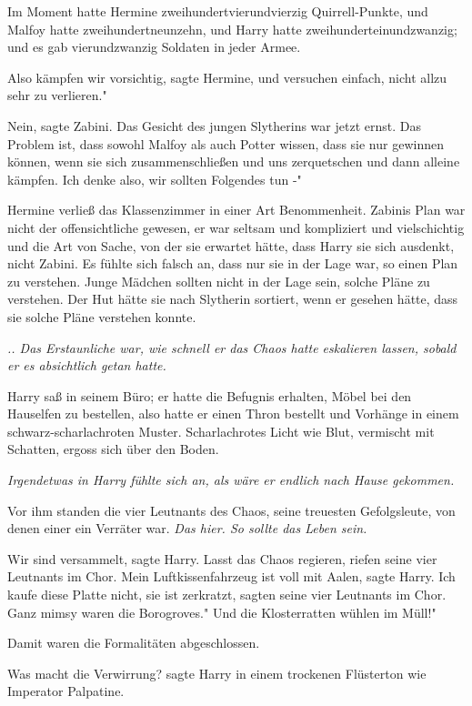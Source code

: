 Im Moment hatte Hermine zweihundertvierundvierzig Quirrell-Punkte, und Malfoy
hatte zweihundertneunzehn, und Harry hatte zweihunderteinundzwanzig; und es gab
vierundzwanzig Soldaten in jeder Armee.

\glqq Also kämpfen wir vorsichtig\grqq{}, sagte Hermine, \glqq und versuchen
einfach, nicht allzu sehr zu verlieren."

\glqq Nein\grqq{}, sagte Zabini. Das Gesicht des jungen Slytherins war jetzt
ernst. \glqq Das Problem ist, dass sowohl Malfoy als auch Potter wissen, dass
sie nur gewinnen können, wenn sie sich zusammenschließen und uns zerquetschen
und dann alleine kämpfen. Ich denke also, wir sollten Folgendes tun -"

Hermine verließ das Klassenzimmer in einer Art Benommenheit. Zabinis Plan war
nicht der offensichtliche gewesen, er war seltsam und kompliziert und
vielschichtig und die Art von Sache, von der sie erwartet hätte, dass Harry sie
sich ausdenkt, nicht Zabini. Es fühlte sich falsch an, dass nur sie in der Lage
war, so einen Plan zu verstehen. Junge Mädchen sollten nicht in der Lage sein,
solche Pläne zu verstehen. Der Hut hätte sie nach Slytherin sortiert, wenn er
gesehen hätte, dass sie solche Pläne verstehen konnte.

\emph{.. Das Erstaunliche war, wie schnell er das Chaos hatte eskalieren lassen,
sobald er es absichtlich getan hatte.}

Harry saß in seinem Büro; er hatte die Befugnis erhalten, Möbel bei den
Hauselfen zu bestellen, also hatte er einen Thron bestellt und Vorhänge in einem
schwarz-scharlachroten Muster. Scharlachrotes Licht wie Blut, vermischt mit
Schatten, ergoss sich über den Boden.

\emph{Irgendetwas in Harry fühlte sich an, als wäre er endlich nach Hause
gekommen.}

Vor ihm standen die vier Leutnants des Chaos, seine treuesten Gefolgsleute, von
denen einer ein Verräter war.\emph{ Das hier. So sollte das Leben sein.}

\glqq Wir sind versammelt\grqq{}, sagte Harry. \glqq Lasst das Chaos
regieren\grqq{}, riefen seine vier Leutnants im Chor. \glqq Mein
Luftkissenfahrzeug ist voll mit Aalen\grqq{}, sagte Harry. \glqq Ich kaufe diese
Platte nicht, sie ist zerkratzt\grqq{}, sagten seine vier Leutnants im Chor.
\glqq Ganz mimsy waren die Borogroves." \glqq Und die Klosterratten wühlen im
Müll!"

Damit waren die Formalitäten abgeschlossen.

\glqq Was macht die Verwirrung?\grqq{} sagte Harry in einem trockenen Flüsterton
wie Imperator Palpatine.

